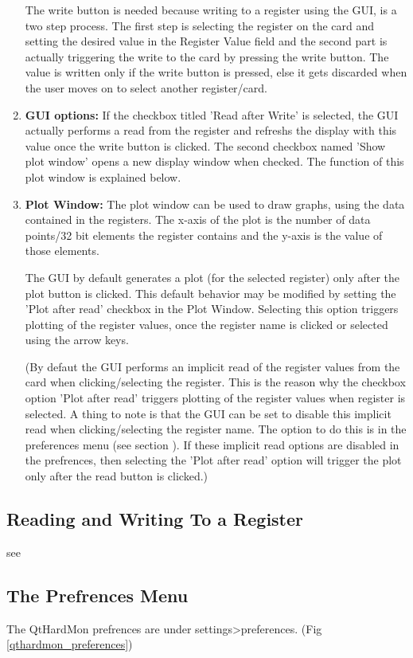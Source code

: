 \begin{enumerate}
The write button is needed because writing to a register using the GUI, is a two step process. The first step is selecting the register on the card and setting the desired value in the Register Value field and the second part is actually triggering the write to the card by pressing the write button. The value is written only if the write button is pressed, else it gets discarded when the user moves on to select another register/card. 
\item \textbf{GUI options:} If the checkbox titled 'Read after Write' is selected, the GUI actually performs a read from the register and refreshs the display with this value once the write button is clicked. The second checkbox named 'Show plot window' opens a new display window when checked. The function of this  plot window is explained below.
\item \textbf{Plot Window:} The plot window can be used to draw graphs, using the data contained in the registers. The x-axis of the plot is the number of data points/32 bit elements the register contains and the y-axis is the value of those elements. 

The GUI by default generates a plot (for the selected register) only after the plot button is clicked. This default behavior may be modified by setting the 'Plot after read' checkbox in the Plot Window. Selecting this option triggers plotting of the register values, once the register name is clicked or selected using the arrow keys. 

(By defaut the GUI performs an implicit read of the register values from the card when clicking/selecting the register. This is the reason why the checkbox option 'Plot after read' triggers plotting of the register values when register is selected. A thing to note is that the GUI can be set to disable this implicit read when clicking/selecting the register name. The option to do this is in the preferences menu (see section ). If these implicit read options are disabled in the prefrences, then selecting the 'Plot after read' option will trigger the plot only after the read button is clicked.)
\end{enumerate}

\subsection{Reading and Writing To a Register}
see 

\subsection{The Prefrences Menu}
The QtHardMon prefrences are under settings>preferences. (Fig \ref{qthardmon_preferences})

